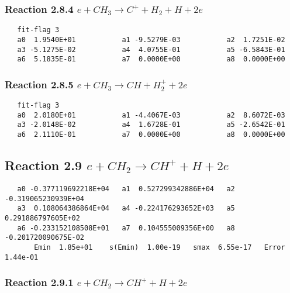 \documentclass[12pt]{article}
\begin{document}
\subsubsection{
Reaction 2.8.4    $e + CH_3 \rightarrow C^{+} + H_2 + H +2e$
}
 
\begin{small}\begin{verbatim}
   fit-flag 3
   a0  1.9540E+01           a1 -9.5279E-03           a2  1.7251E-02 
   a3 -5.1275E-02           a4  4.0755E-01           a5 -6.5843E-01 
   a6  5.1835E-01           a7  0.0000E+00           a8  0.0000E+00
\end{verbatim}\end{small}


\subsubsection{
Reaction 2.8.5    $e + CH_{3} \rightarrow CH + H_{2}^{+} +2e $
}
 
\begin{small}\begin{verbatim}
   fit-flag 3
   a0  2.0180E+01           a1 -4.4067E-03           a2  8.6072E-03 
   a3 -2.0148E-02           a4  1.6728E-01           a5 -2.6542E-01 
   a6  2.1110E-01           a7  0.0000E+00           a8  0.0000E+00
\end{verbatim}\end{small}


\subsection{
Reaction 2.9     $e + CH_2 \rightarrow  CH^+ + H + 2e$
}

\begin{small}\begin{verbatim} 
   a0 -0.377119692218E+04   a1  0.527299342886E+04   a2 -0.319065230939E+04
   a3  0.108064386864E+04   a4 -0.224176293652E+03   a5  0.291886797605E+02
   a6 -0.233152108508E+01   a7  0.104555009356E+00   a8 -0.201720090675E-02
       Emin  1.85e+01    s(Emin)  1.00e-19   smax  6.55e-17   Error  1.44e-01
\end{verbatim}\end{small}

\subsubsection{
Reaction 2.9.1   $e + CH_{2} \rightarrow CH^{+} + H + 2e$ 
}
\end{document}
